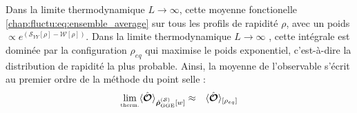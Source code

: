 \medskip

Dans la limite thermodynamique \(L\to\infty\), cette moyenne fonctionelle \eqref{chap:fluctu:eq:ensemble_average} sur tous les profils de rapidité $\rho$, avec un poids $\propto e^{(\mathcal{S}_{YY}[\rho] - \mathcal{W}[\rho])}$. Dans la limite thermodynamique $L \to \infty$ , cette intégrale est dominée par la configuration $ \rho_{eq}$ qui maximise le poids exponentiel, c’est-à-dire la distribution de rapidité la plus probable. Ainsi, la moyenne de l’observable s’écrit au premier ordre de la méthode du point selle :
\begin{eqnarray}
	\underset{\mbox{\tiny therm.}}{\lim}\langle \hat{\bm{\mathcal{O}}} \rangle_{\hat{\bm{\rho}}_{\mathrm{GGE}}^{(\mathcal{S})}[w]} & \approx & \langle\hat{\bm{\mathcal{O}}} \rangle_{[\rho_{eq}]}	
	\label{chap:fluctu:eq:ensemble_average:approx}
\end{eqnarray}

	




